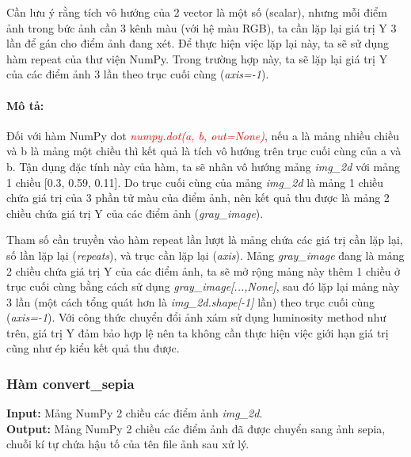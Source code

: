 \documentclass{article}
\begin{document}
Cần lưu ý rằng tích vô hướng của 2 vector là một số (scalar), nhưng mỗi điểm ảnh trong bức ảnh cần 3 kênh màu (với hệ màu RGB), ta cần lặp lại giá trị Y 3 lần để gán cho điểm ảnh đang xét. Để thực hiện việc lặp lại này, ta sẽ sử dụng hàm repeat của thư viện NumPy. Trong trường hợp này, ta sẽ lặp lại giá trị Y của các điểm ảnh 3 lần theo trục cuối cùng (\textit{axis=-1}).

\paragraph{Mô tả:}
Đối với hàm NumPy dot \textcolor{red}{\textit{numpy.dot(a, b, out=None)}}, nếu a là mảng nhiều chiều và b là mảng một chiều thì kết quả là tích vô hướng trên trục cuối cùng của a và b. Tận dụng đặc tính này của hàm, ta sẽ nhân vô hướng mảng \textit{img\_2d} với mảng 1 chiều [0.3, 0.59, 0.11]. Do trục cuối cùng của mảng \textit{img\_2d} là mảng 1 chiều chứa giá trị của 3 phần tử màu của điểm ảnh, nên kết quả thu được là mảng 2 chiều chứa giá trị Y của các điểm ảnh (\textit{gray\_image}). 

Tham số cần truyền vào hàm repeat lần lượt là mảng chứa các giá trị cần lặp lại, số lần lặp lại (\textit{repeats}), và trục cần lặp lại (\textit{axis}). Mảng \textit{gray\_image} đang là mảng 2 chiều chứa giá trị Y của các điểm ảnh, ta sẽ mở rộng mảng này thêm 1 chiều ở trục cuối cùng bằng cách sử dụng \textit{gray\_image[...,None]}, sau đó lặp lại mảng này 3 lần (một cách tổng quát hơn là \textit{img\_2d.shape[-1]} lần) theo trục cuối cùng (\textit{axis=-1}). Với công thức chuyển đổi ảnh xám sử dụng luminosity method như trên, giá trị Y đảm bảo hợp lệ nên ta không cần thực hiện việc giới hạn giá trị cũng như ép kiểu kết quả thu được.

\subsubsection{Hàm convert\_sepia}
\textbf{Input:} Mảng NumPy 2 chiều các điểm ảnh \textit{img\_2d}. \\
\textbf{Output:} Mảng NumPy 2 chiều các điểm ảnh đã được chuyển sang ảnh sepia, chuỗi kí tự chứa hậu tố của tên file ảnh sau xử lý.
\end{document}
